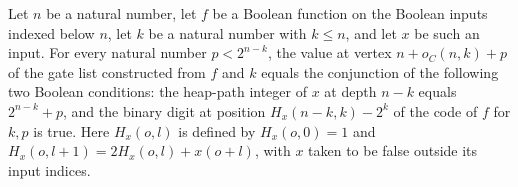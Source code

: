 \begin{theorem}
\label{BoolCircuit.Lupanov.value_comb}
\leanok
{}
Let $n$ be a natural number, let $f$ be a Boolean function on the Boolean inputs indexed
below $n$, let $k$ be a natural number with $k\le n$, and let $x$ be such an input. For
every natural number $p<2^{n-k}$, the value at vertex $n+o_C(n,k)+p$ of the gate list
constructed from $f$ and $k$ equals the conjunction of the following two Boolean
conditions: the heap-path integer of $x$ at depth $n-k$ equals $2^{n-k}+p$, and the
binary digit at position $H_x(n-k,k)-2^k$ of the code of $f$ for $k,p$ is true. Here
$H_x(o,l)$ is defined by $H_x(o,0)=1$ and $H_x(o,l+1)=2H_x(o,l)+x(o+l)$, with $x$ taken
to be false outside its input indices.
\end{theorem}
